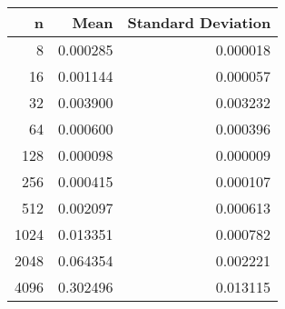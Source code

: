 \begin{tabular}{rrr}
\toprule
    n &      Mean &  Standard Deviation \\
\midrule
    8 &  0.000285 &            0.000018 \\
   16 &  0.001144 &            0.000057 \\
   32 &  0.003900 &            0.003232 \\
   64 &  0.000600 &            0.000396 \\
  128 &  0.000098 &            0.000009 \\
  256 &  0.000415 &            0.000107 \\
  512 &  0.002097 &            0.000613 \\
 1024 &  0.013351 &            0.000782 \\
 2048 &  0.064354 &            0.002221 \\
 4096 &  0.302496 &            0.013115 \\
\bottomrule
\end{tabular}
